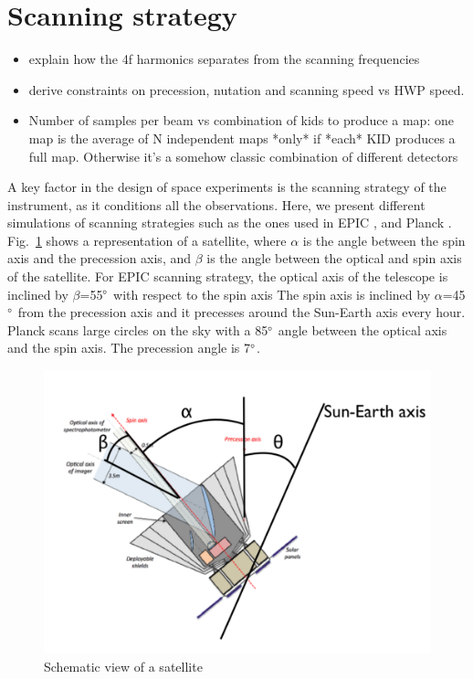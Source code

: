 
\section{Scanning strategy}
\label{se:scan_strat}

\begin{itemize}
\item explain how the 4f harmonics separates from the scanning frequencies
\item derive constraints on precession, nutation and scanning speed vs HWP
  speed.
\item Number of samples per beam vs combination of kids to produce a map: one
  map is the average of N independent maps *only* if *each* KID produces a full
  map. Otherwise it's a somehow classic combination of different detectors
\end{itemize}

A key factor in the design of space experiments is the scanning strategy of the instrument, as it conditions all the observations. Here, we present different simulations of scanning strategies such as the ones used in EPIC \citep{2009arXiv0906.1188B}, and Planck \citep{2005A&A...430..363D}. \\

Fig.~\ref{fig:satellite} shows a representation of a satellite, where $\alpha$ is the angle between the spin axis and the precession axis, and $\beta$ is the angle between the optical and spin axis of the satellite.
For EPIC scanning strategy, the optical axis of the telescope is inclined by $\beta$=55$\degree$ with respect to the spin axis The spin axis is inclined by $\alpha$=45$\degree$ from the precession axis and it precesses around the Sun-Earth axis every hour.
Planck scans large circles on the sky with a 85$\degree$ angle between the optical axis and the spin axis. The precession angle is 7$\degree$.

\begin{figure}[h]
  \includegraphics[clip,angle=0,width=\columnwidth]{Figures/schema_satellite.png}
  \caption{Schematic view of a satellite}
  \label{fig:satellite}
\end{figure}

